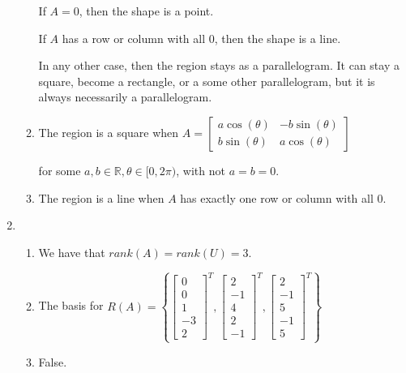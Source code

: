 \documentclass[12pt,letterpaper]{article}
\begin{document}
\begin{enumerate}
\begin{enumerate}
          If $A = 0$, then the shape is a point.

          If $A$ has a row or column with all 0, then the shape is a line.

          In any other case, then the region stays as a parallelogram.
          It can stay a square, become a rectangle, or a some other parallelogram, but it is always necessarily a parallelogram.
        \item
          The region is a square when $A = \begin{bmatrix}a \cos(\theta) & -b \sin(\theta) \\ b \sin(\theta) & a \cos(\theta)\end{bmatrix}$

          for some $a, b \in \mathbb{R}, \theta \in [0, 2\pi)$, with not $a = b = 0$.
        \item
          The region is a line when $A$ has exactly one row or column with all 0.
      \end{enumerate}
    \item
      \begin{enumerate}
        \item We have that $rank(A) = rank(U) = 3$.
        \item
          The basis for
          $R(A) = \left\{\begin{bmatrix}0 \\ 0 \\ 1 \\ -3 \\ 2\end{bmatrix}^T, \begin{bmatrix}2 \\ -1 \\ 4 \\ 2 \\ -1\end{bmatrix}^T, \begin{bmatrix}2 \\ -1 \\ 5 \\ -1 \\ 5\end{bmatrix}^T\right\}$
        \item
          False.


\end{enumerate}
\end{enumerate}
\end{document}
